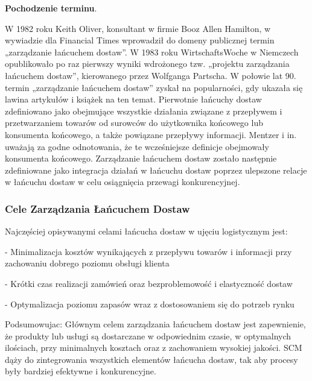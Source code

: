 \vspace{\baselineskip}
\textbf{Pochodzenie terminu}.

W 1982 roku Keith Oliver, konsultant w firmie Booz Allen Hamilton, w wywiadzie dla Financial Times wprowadził do domeny publicznej termin „zarządzanie łańcuchem dostaw”. W 1983 roku WirtschaftsWoche w Niemczech opublikowało po raz pierwszy wyniki wdrożonego tzw. „projektu zarządzania łańcuchem dostaw”, kierowanego przez Wolfganga Partscha.
W połowie lat 90. termin „zarządzanie łańcuchem dostaw” zyskał na popularności, gdy ukazała się lawina artykułów i książek na ten temat. Pierwotnie łańcuchy dostaw zdefiniowano jako obejmujące wszystkie działania związane z przepływem i przetwarzaniem towarów od surowców do użytkownika końcowego lub konsumenta końcowego, a także powiązane przepływy informacji. Mentzer i in. uważają za godne odnotowania, że te wcześniejsze definicje obejmowały konsumenta końcowego. Zarządzanie łańcuchem dostaw zostało następnie zdefiniowane jako integracja działań w łańcuchu dostaw poprzez ulepszone relacje w łańcuchu dostaw w celu osiągnięcia przewagi konkurencyjnej. \cite{wiken2023}


\vspace{\baselineskip}
\subsubsection{Cele Zarządzania Łańcuchem Dostaw}



Najczęściej opisywanymi celami łańcucha dostaw w ujęciu logistycznym jest:

  \par - Minimalizacja kosztów wynikających z przepływu towarów i informacji przy zachowaniu dobrego poziomu obsługi klienta
  
  \par - Krótki czas realizacji zamówień oraz bezproblemowość i elastyczność dostaw
  
   \par- Optymalizacja poziomu zapasów wraz z dostosowaniem się do potrzeb rynku \cite{zarz2023}


Podsumowujac: Głównym celem zarządzania łańcuchem dostaw jest zapewnienie, że produkty lub usługi są dostarczane w odpowiednim czasie, w optymalnych ilościach, przy minimalnych kosztach oraz z zachowaniem wysokiej jakości. SCM dąży do zintegrowania wszystkich elementów łańcucha dostaw, tak aby procesy były bardziej efektywne i konkurencyjne.

